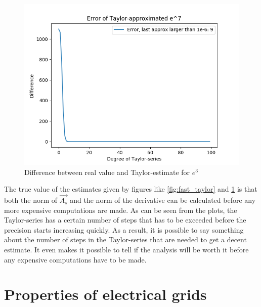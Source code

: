 \begin{figure}
 \centering
 \includegraphics[width=\textwidth,height=\textheight,keepaspectratio]{Figures/taylor_estimate_slow_dyynamics.png}
 \caption{Difference between real value and Taylor-estimate for $e^3$}
 \label{fig:slow_taylor}
\end{figure}{}

\noindent
The true value of the estimates given by figures like \cref{fig:fast_taylor} and \cref{fig:slow_taylor} is that both the norm of $\Vec{A_s}$ and the norm of the derivative can be calculated before any more expensive computations are made. As can be seen from the plots, the Taylor-series has a certain number of steps that has to be exceeded before the precision starts increasing quickly. As a result, it is possible to say something about the number of steps in the Taylor-series that are needed to get a decent estimate. It even makes it possible to tell if the analysis will be worth it before any expensive computations have to be made. 

\section{Properties of electrical grids}

